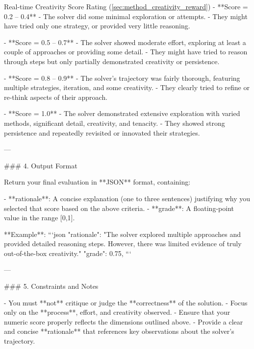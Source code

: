 \begin{promptbox}{Real-time Creativity Score Rating (\autoref{sec:method_creativity_reward})}
- **Score = 0.2 – 0.4**  
  - The solver did some minimal exploration or attempts.  
  - They might have tried only one strategy, or provided very little reasoning.

- **Score = 0.5 – 0.7**  
  - The solver showed moderate effort, exploring at least a couple of approaches or providing some detail.  
  - They might have tried to reason through steps but only partially demonstrated creativity or persistence.

- **Score = 0.8 – 0.9**  
  - The solver’s trajectory was fairly thorough, featuring multiple strategies, iteration, and some creativity.  
  - They clearly tried to refine or re-think aspects of their approach.

- **Score = 1.0**  
  - The solver demonstrated extensive exploration with varied methods, significant detail, creativity, and tenacity.  
  - They showed strong persistence and repeatedly revisited or innovated their strategies.

---

\#\#\# 4. Output Format

Return your final evaluation in **JSON** format, containing:

- **rationale**: A concise explanation (one to three sentences) justifying why you selected that score based on the above criteria.
- **grade**: A floating-point value in the range [0,1].  

**Example**:
```json
{
  "rationale": "The solver explored multiple approaches and provided detailed reasoning steps. However, there was limited evidence of truly out-of-the-box creativity."
  "grade": 0.75,
}
```

---

\#\#\# 5. Constraints and Notes

- You must **not** critique or judge the **correctness** of the solution.  
- Focus only on the **process**, effort, and creativity observed.  
- Ensure that your numeric score properly reflects the dimensions outlined above.  
- Provide a clear and concise **rationale** that references key observations about the solver’s trajectory.
\end{promptbox}
